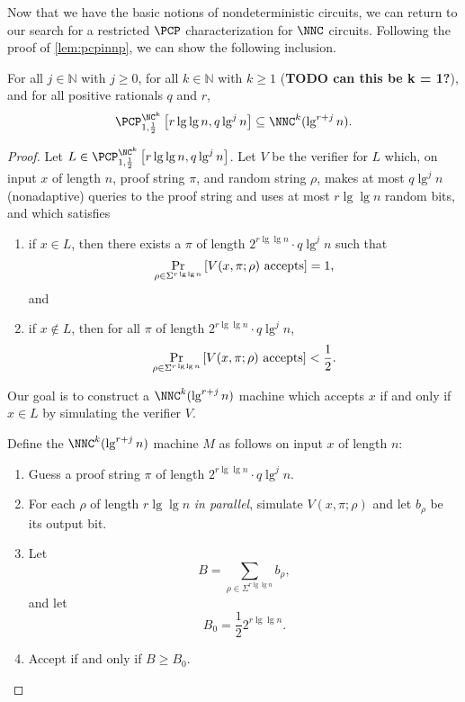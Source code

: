 \documentclass[]{article}
\newcommand{\PCPcs}[5]{\PCP^{#1}_{#2, #3}\left[#4, #5\right]}
\begin{document}
Now that we have the basic notions of nondeterministic circuits, we can return to our search for a restricted $\PCP$ characterization for $\NNC$ circuits.
Following the proof of \autoref{lem:pcpinnp}, we can show the following inclusion.
\begin{proposition}\label{prop:pcpinnnc}
  For all $j \in \mathbb{N}$ with $j \geq 0$, for all $k \in \mathbb{N}$ with $k \geq 1$ (\textbf{TODO can this be k = 1?}), and for all positive rationals $q$ and $r$,
  \begin{equation*}
    \PCPcs{\NC^k}{1}{\frac{1}{2}}{r \lg \lg n}{q \lg^j n} \subseteq \NNC^k(\lg^{r + j} n).
  \end{equation*}
\end{proposition}
\begin{proof}
  Let $L \in \PCPcs{\NC^k}{1}{\frac{1}{2}}{r \lg \lg n}{q \lg^j n}$.
  Let $V$ be the \PCP{} verifier for $L$ which, on input $x$ of length $n$, proof string $\pi$, and random string $\rho$, makes at most $q \lg^j n$ (nonadaptive) queries to the proof string and uses at most $r \lg \lg n$ random bits, and which satisfies
  \begin{enumerate}
  \item if $x \in L$, then there exists a $\pi$ of length $2^{r \lg \lg n} \cdot q \lg^j n$ such that
    \begin{equation*}
      \Pr_{\rho \in \Sigma^{r \lg \lg n}}{\left[V(x, \pi; \rho) \textnormal{ accepts}\right]} = 1,
    \end{equation*}
    and
  \item if $x \notin L$, then for all $\pi$ of length $2^{r \lg \lg n} \cdot q \lg^j n$,
    \begin{equation*}
      \Pr_{\rho \in \Sigma^{r \lg \lg n}}{\left[V(x, \pi; \rho) \textnormal{ accepts}\right]} < \frac{1}{2}.
    \end{equation*}
  \end{enumerate}
  Our goal is to construct a $\NNC^k(\lg^{r + j} n)$ machine which accepts $x$ if and only if $x \in L$ by simulating the \PCP{} verifier $V$.

  Define the $\NNC^k(\lg^{r + j} n)$ machine $M$ as follows on input $x$ of length $n$:
  \begin{enumerate}
  \item Guess a proof string $\pi$ of length $2^{r \lg \lg n} \cdot q \lg^j n$.
  \item For each $\rho$ of length $r \lg \lg n$ \emph{in parallel}, simulate $V(x, \pi; \rho)$ and let $b_\rho$ be its output bit.
  \item Let
    \begin{equation*}
      B = \sum_{\rho \in \Sigma^{r \lg \lg n}}{b_\rho},
    \end{equation*}
    and let
    \begin{equation*}
      B_0 = \frac{1}{2} 2^{r \lg \lg n}.
    \end{equation*}
  \item Accept if and only if $B \geq B_0$.
  \end{enumerate}


\end{proof}
\end{document}
